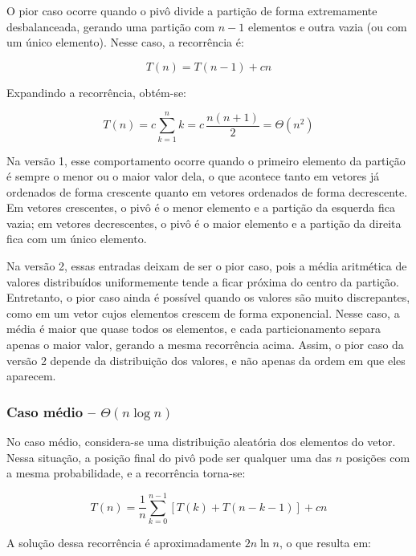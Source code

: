 O pior caso ocorre quando o pivô divide a partição de forma
extremamente desbalanceada, gerando uma partição com $n-1$ elementos e
outra vazia (ou com um único elemento). Nesse caso, a recorrência é:

\begin{equation}
T(n) = T(n-1) + cn
\end{equation}

Expandindo a recorrência, obtém-se:

\begin{equation}
T(n) = c\sum_{k=1}^{n} k = c\,\frac{n(n+1)}{2} = \Theta(n^2)
\end{equation}

Na versão 1, esse comportamento ocorre quando o primeiro elemento da
partição é sempre o menor ou o maior valor dela, o que acontece tanto em
vetores já ordenados de forma crescente quanto em vetores ordenados de
forma decrescente. Em vetores crescentes, o pivô é o menor elemento e
a partição da esquerda fica vazia; em vetores decrescentes, o pivô é o
maior elemento e a partição da direita fica com um único elemento.

Na versão 2, essas entradas deixam de ser o pior caso, pois a média
aritmética de valores distribuídos uniformemente tende a ficar próxima
do centro da partição. Entretanto, o pior caso ainda é possível quando os
valores são muito discrepantes, como em um vetor cujos elementos crescem
de forma exponencial. Nesse caso, a média é maior que quase todos os
elementos, e cada particionamento separa apenas o maior valor, gerando a
mesma recorrência acima. Assim, o pior caso da versão 2 depende da
distribuição dos valores, e não apenas da ordem em que eles aparecem.

\subsubsection{Caso médio -- $\Theta(n\log n)$}

No caso médio, considera-se uma distribuição aleatória dos elementos
do vetor. Nessa situação, a posição final do pivô pode ser qualquer uma
das $n$ posições com a mesma probabilidade, e a recorrência torna-se:

\begin{equation}
T(n) = \frac{1}{n}\sum_{k=0}^{n-1}\left[T(k) + T(n-k-1)\right] + cn
\end{equation}

A solução dessa recorrência é aproximadamente $2n\ln n$, o que resulta
em:

